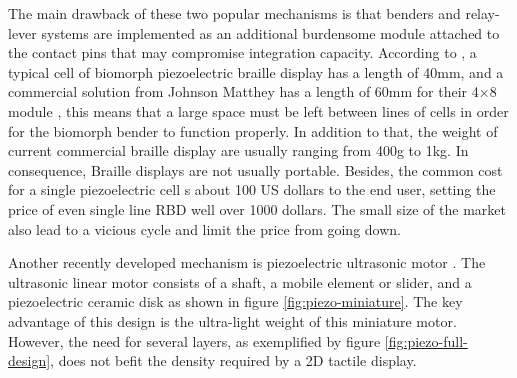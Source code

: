 The main drawback of these two popular mechanisms is that benders and relay-lever systems are implemented as an additional burdensome module attached to the contact pins that may compromise integration capacity. According to 
\cite{di_bucchianico_survey_2018}, a typical cell of biomorph piezoelectric braille display has a length of 40mm, and a commercial solution from Johnson Matthey has a length of 60mm for their 4×8 module \cite{JM_braille_display}, this means that a large space must be left between lines of cells in order for the biomorph bender to function properly. In addition to that, the weight of current commercial braille display are usually ranging from 400g to 1kg.\cite{Humanware_BrailleNote} \cite{Brailliant_BI_40X}
In consequence, Braille displays are not usually portable. Besides, the common cost for a single piezoelectric cell s about 100 US dollars to the end user, setting the price of even single line RBD well over 1000 dollars. The small size of the market also lead to a vicious cycle and limit the price from going down.

Another recently developed mechanism is piezoelectric ultrasonic motor \cite{hernandez_characterization_2009}.
The ultrasonic linear motor consists of a shaft, a mobile element or slider, and a piezoelectric ceramic disk as shown in figure \ref{fig:piezo-miniature}.
The key advantage of this design is the ultra-light weight of this miniature motor.
However, the need for several layers, as exemplified by figure \ref{fig:piezo-full-design}, does not befit the density required by a 2D tactile display.

